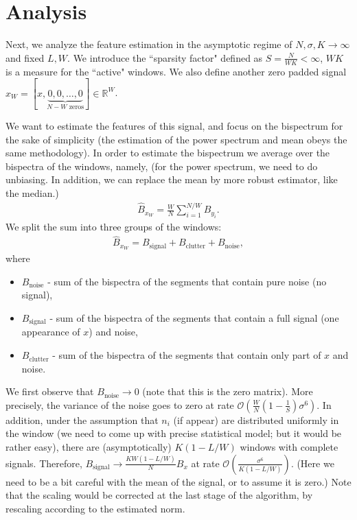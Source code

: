 \documentclass[journal]{IEEEtran}
\numberwithin{equation}{section}
\numberwithin{figure}{section}
\theoremstyle{plain}
\theoremstyle{definition}
\theoremstyle{remark}
\theoremstyle{plain}
\theoremstyle{remark}
\theoremstyle{plain}
\theoremstyle{plain}
\newcommand{\order}[1]{\mathcal{O}\left({#1} \right)}
\begin{document}
\section{Analysis} \label{sec:analysis}


Next, we analyze the feature estimation in the asymptotic regime of $N,\sigma,K\to\infty$ and fixed $L,W$. We introduce the ``sparsity factor" defined as $S = \frac{N}{WK}<\infty$, $WK$ is a measure for the ``active" windows. We also define  another zero padded signal $x_W  = [x, \underbrace{0,0,\ldots,0}_{N-W \text{ zeros}}]\in\mathbb{R}^W$.

We want to estimate the features of this signal, and focus on the bispectrum for the sake of simplicity (the estimation of the power spectrum and mean obeys the same methodology). 
In order to estimate the bispectrum we average over the bispectra of the windows, namely, (for the power spectrum, we need to do unbiasing. In addition, we can replace the mean by more robust estimator, like the median.)
\begin{eqnarray}
\hat{B}_{x_W} = \frac{W}{N}\sum_{i=1}^{N/W}B_{y_i}.
\end{eqnarray}
We split the sum into three groups of the windows:
\begin{eqnarray}
\hat{B}_{x_W} = B_\textrm{signal} + B_\textrm{clutter} + B_\textrm{noise}, 
\end{eqnarray}
where
\begin{itemize}
	\item $B_\textrm{noise}$ - sum of the bispectra of the segments that contain pure noise (no signal),
	\item $B_\textrm{signal}$ - sum of the bispectra of the segments that contain a full signal (one appearance of $x$) and noise,
	\item $B_\textrm{clutter}$ - sum of the bispectra of the segments that contain only part of $x$ and noise.
\end{itemize}

We first observe that $B_\textrm{noise}\to 0$ (note that this is the zero matrix). More precisely, the variance of the noise goes to zero at rate  $\order{\frac{W}{N}\left(1-\frac{1}{S}\right)\sigma^6}$. In addition, under the assumption that $n_i$ (if appear) are distributed uniformly in the window (we need to come up with precise statistical model; but it would be rather easy), there are (asymptotically) $K(1-L/W)$ windows with complete signals. Therefore,
$B_\textrm{signal}\to \frac{KW(1-L/W)}{N}B_x$ at rate $\order{\frac{\sigma^6}{K(1-L/W)}}$. (Here we need to be a bit careful with the mean of the signal, or to assume it is zero.) Note that the scaling would be corrected at the last stage of the algorithm, by rescaling according to the estimated  norm.
\end{document}
